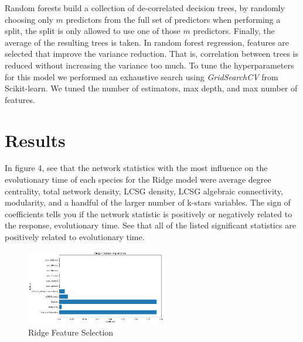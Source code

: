 \documentclass[12pt]{article}
\begin{document}
Random forests build a collection of de-correlated decision trees, by randomly choosing only $m$ predictors from the full set of predictors when performing a split, the split is only allowed to use one of those $m$ predictors. Finally, the average of the resulting trees is taken. In random forest regression, features are selected that improve the variance reduction. That is, correlation between trees is reduced without increasing the variance too much. To tune the hyperparameters for this model we performed an exhaustive search using \textit{GridSearchCV} from Scikit-learn. We tuned the number of estimators, max depth, and max number of features. 

\section{Results}
In figure 4, see that the network statistics with the most influence on the evolutionary time of each species for the Ridge model were average degree centrality, total network density, LCSG density, LCSG algebraic connectivity, modularity, and a handful of the larger number of k-stars variables. The sign of coefficients tells you if the network statistic is positively or negatively related to the response, evolutionary time. See that all of the listed significant statistics are positively related to evolutionary time.
\begin{figure}
  \vspace{-20pt}
  \begin{center}
    \includegraphics[width=0.548\textwidth]{PPIN_fig3}
  \end{center}
  \vspace{-20pt}
  \caption{Ridge Feature Selection}
  \vspace{-10pt}
\end{figure}
\end{document}

